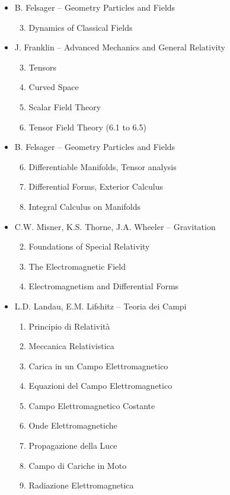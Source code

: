 \begin{itemize}

\item B. Felsager -- Geometry Particles and Fields
\begin{enumerate}
\setcounter{enumi}{2}
\item Dynamics of Classical Fields
\end{enumerate}


\item J. Franklin -- Advanced Mechanics and General Relativity
\begin{enumerate}
\setcounter{enumi}{2}
\item Tensors
\item Curved Space
\item Scalar Field Theory
\item Tensor Field Theory (6.1 to 6.5)
\end{enumerate}

\item B. Felsager -- Geometry Particles and Fields
\begin{enumerate}
\setcounter{enumi}{5}
\item Differentiable Manifolds, Tensor analysis
\item Differential Forms, Exterior Calculus
\item Integral Calculus on Manifolds
\end{enumerate}

\item C.W. Misner, K.S. Thorne, J.A. Wheeler -- Gravitation
\begin{enumerate}
\setcounter{enumi}{1}
\item Foundations of Special Relativity
\item The Electromagnetic Field
\item Electromagnetism and Differential Forms
\end{enumerate}



\item L.D. Landau, E.M. Lifshitz -- Teoria dei Campi
\begin{enumerate}
\setcounter{enumi}{0}
\item Principio di Relatività
\item Meccanica Relativistica
\item Carica in un Campo Elettromagnetico
\item Equazioni del Campo Elettromagnetico
\item Campo Elettromagnetico Costante
\item Onde Elettromagnetiche
\item Propagazione della Luce
\item Campo di Cariche in Moto
\item Radiazione Elettromagnetica
\end{enumerate}


\end{itemize}
